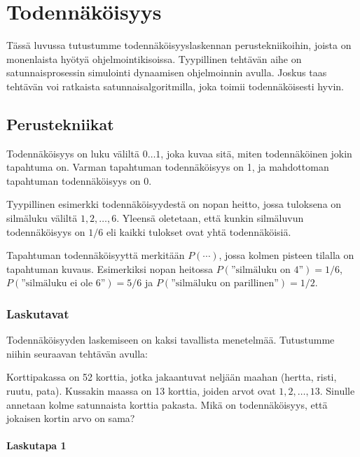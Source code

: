 \chapter{Todennäköisyys}

Tässä luvussa tutustumme todennäköisyyslaskennan
perustekniikoihin, joista on monenlaista
hyötyä ohjelmointikisoissa.
Tyypillinen tehtävän aihe on satunnaisprosessin
simulointi dynaamisen ohjelmoinnin avulla.
Joskus taas tehtävän voi ratkaista satunnaisalgoritmilla,
joka toimii todennäköisesti hyvin.

\section{Perustekniikat}

Todennäköisyys on luku väliltä $0 \ldots 1$,
joka kuvaa sitä, miten todennäköinen jokin
tapahtuma on.
Varman tapahtuman todennäköisyys on 1,
ja mahdottoman tapahtuman todennäköisyys on 0.

Tyypillinen esimerkki todennäköisyydestä
on nopan heitto, jossa tuloksena
on silmäluku väliltä $1,2,\ldots,6$.
Yleensä oletetaan, että kunkin silmäluvun
todennäköisyys on $1/6$
eli kaikki tulokset ovat yhtä todennäköisiä.

Tapahtuman todennäköisyyttä merkitään $P(\cdots)$,
jossa kolmen pisteen tilalla on tapahtuman kuvaus.
Esimerkiksi nopan heitossa
$P(\textrm{''silmäluku on 4''})=1/6$,
$P(\textrm{''silmäluku ei ole 6''})=5/6$
ja $P(\textrm{''silmäluku on parillinen''})=1/2$.

\subsection{Laskutavat}

Todennäköisyyden laskemiseen on
kaksi tavallista menetelmää. Tutustumme niihin
seuraavan tehtävän avulla:

\begin{task}
Korttipakassa on 52 korttia, jotka jakaantuvat
neljään maahan (hertta, risti, ruutu, pata).
Kussakin maassa on 13 korttia, joiden arvot ovat $1,2,\ldots,13$.
Sinulle annetaan kolme satunnaista korttia pakasta.
Mikä on todennäköisyys, että jokaisen kortin arvo on sama?
\end{task}

\subsubsection*{Laskutapa 1}

